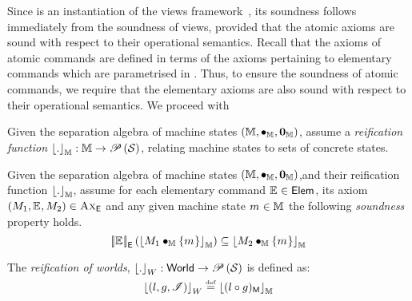 Since \colosl is an instantiation of the views framework~\cite{views}, its soundness follows immediately from the soundness of views, provided that the atomic axioms are sound with respect to their operational semantics. Recall that the axioms of atomic commands are defined in terms of the axioms pertaining to elementary commands which are parametrised in \colosl. Thus, to ensure the soundness of atomic commands, we require that the elementary axioms are also sound with respect to their operational semantics. We proceed with 

\begin{parameter}
%
Given the separation algebra of machine states $(\mathbb{M}, \bullet_{\mathbb{M}}, \mathbf{0}_{\mathbb{M}})$, assume a \emph{reification function} $\left\lfloor . \right\rfloor_{\mathbb{M}}: \mathbb{M} \rightarrow \mathscr{P}\left(\mathcal{S} \right)$, relating machine states to sets of concrete states. 
\end{parameter}
%
\begin{parameter}\label{param:elementary-soundness}
Given the separation algebra of machine states $(\mathbb{M}, \bullet_{\mathbb{M}}, \mathbf{0}_{\mathbb{M}})$,and their reification function $\left\lfloor . \right\rfloor_{\mathbb{M}}$, assume for each elementary command $\mathbb{E}_{} \in \textsf{Elem}$, its axiom $\left(M_1, \mathbb{E}_{}, M_2\right) \in \textsc{Ax}_{\textsf{E}}$ and any given machine state $m_{} \in \mathbb{M}$ the following \emph{soundness} property holds.
%
\[
	\left[\!\left| \mathbb{E}_{} \right |\! \right]_{\textsf{E}}\left( \left\lfloor M_1 \bullet_{\mathbb{M}} \{m_{}\} \right\rfloor_{\mathbb{M}} \right) \subseteq  \left\lfloor M_2 \bullet_{\mathbb{M}} \{m_{}\} \right\rfloor_{\mathbb{M}}
\]
%
\end{parameter}
%
%
%
\begin{definition}[Reification]\label{def:reification}
The \emph{reification of worlds}, $\left\lfloor . \right\rfloor_{W}: \textsf{World} \rightarrow \mathscr{P}\left(\mathcal{S} \right)$ is defined as:
%
\[
	\left\lfloor (l, g, \mathscr{I}) \right\rfloor_{W} \mathrel{\stackrel{\smash{\scriptscriptstyle{\mathrm{def}}}}{=}} \left\lfloor (l \circ g)_{\textsf{M}} \right\rfloor_{\mathbb{M}}
\]
%
\end{definition}
%
